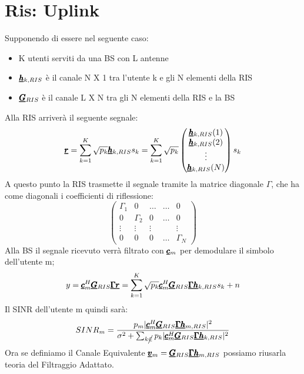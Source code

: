 \section{Ris: Uplink}
Supponendo di essere nel seguente caso:
\begin{itemize}
    \item K utenti serviti da una BS con L antenne
    \item $\pmb{\underline{h}}_{k,RIS}$ è il canale N X 1 tra l'utente k e gli N elementi della RIS
    \item $\pmb{\underline{G}}_{RIS}$ è il canale L X N tra gli N elementi della RIS e la BS
\end{itemize}
Alla RIS arriverà il seguente segnale:
\begin{equation*}
    \pmb{\underline{r}} = \sum_{k=1}^K \sqrt{p_k} \pmb{\underline{h}}_{k,RIS} s_k = \sum_{k=1}^K \sqrt{p_k} \begin{pmatrix} 
    \pmb{\underline{h}}_{k,RIS} (1) \\
    \pmb{\underline{h}}_{k,RIS} (2) \\
    \vdots \\
    \pmb{\underline{h}}_{k,RIS} (N) \\
    \end{pmatrix}
    s_k
\end{equation*}
A questo punto la RIS trasmette il segnale tramite la matrice diagonale $\Gamma$, che ha come diagonali i coefficienti di riflessione:
\begin{equation*}
    \begin{pmatrix}
    \Gamma_1 & 0 & \dots & \dots & 0 \\
    0 & \Gamma_2 & 0 & \dots & 0 \\
    \vdots & \vdots & \vdots & & \vdots \\
    0 & 0 & 0 & \dots & \Gamma_N
    \end{pmatrix}
\end{equation*}
Alla BS il segnale ricevuto verrà filtrato con $\pmb{\underline{c}}_m$ per demodulare il simbolo dell'utente m;
\begin{equation*}
    y = \pmb{\underline{c}}_m^H \pmb{\underline{G}}_{RIS} \pmb{\underline{\Gamma}} \pmb{\underline{r}} = \sum_{k=1}^K \sqrt{p_k} \pmb{\underline{c}}_m^H \pmb{\underline{G}}_{RIS} \pmb{\underline{\Gamma}} \pmb{\underline{h}}_{k,RIS} s_k + n
\end{equation*}
Il SINR dell'utente m quindi sarà:
\begin{equation*}
    SINR_m = \frac{p_m |\pmb{\underline{c}}_m^H \pmb{\underline{G}}_{RIS} \pmb{\underline{\Gamma}} \pmb{\underline{h}}_{m,RIS}|^2}{\sigma^2 + \sum_{k \cancel{\in}} p_k |\pmb{\underline{c}}_m^H \pmb{\underline{G}}_{RIS} \pmb{\underline{\Gamma}} \pmb{\underline{h}}_{k,RIS}|^2}
\end{equation*}
Ora se definiamo il Canale Equivalente $\pmb{\underline{v}}_m = \pmb{\underline{G}}_{RIS} \pmb{\underline{\Gamma}} \pmb{\underline{h}}_{m,RIS}$ possiamo riusarla teoria del Filtraggio Adattato.


